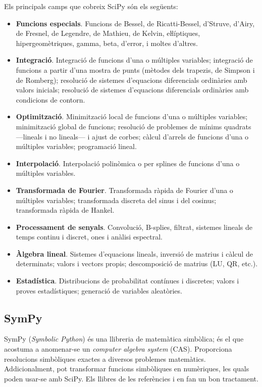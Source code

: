 Els principals camps  que cobreix SciPy són els següents:
\begin{itemize}
	\item \textbf{Funcions especials}. Funcions de Bessel, de Ricatti-Bessel, d'Struve,  d'Airy, de Fresnel, de Legendre, de Mathieu, de Kelvin, eŀlíptiques, hipergeomètriques, gamma, beta, d'error,  i moltes d'altres.
	\item \textbf{Integració}. Integració de funcions d'una o múltiples variables; integració de funcions a partir d'una mostra de punts (mètodes dels trapezis, de Simpson i de Romberg); resolució de sistemes d'equacions diferencials ordinàries amb valors inicials; resolució de sistemes d'equacions diferencials ordinàries amb condicions de contorn.
	\item \textbf{Optimització}. Minimització local de funcions d'una o múltiples variables; minimització global de funcions; resolució de problemes de mínims quadrats ---lineals i no lineals--- i ajust de corbes; càlcul d'arrels de funcions d'una o múltiples variables;  programació lineal.
	\item \textbf{Interpolació}. Interpolació polinòmica o per splines de funcions d'una o múltiples variables.
	\item \textbf{Transformada de Fourier}. Transformada ràpida de Fourier d'una o múltiples variables; transformada discreta del sinus i del cosinus; transformada ràpida de Hankel.
	\item \textbf{Processament de senyals}. Convolució, B-splies, filtrat, sistemes lineals de temps continu i discret, ones i anàlisi espectral.
	\item \textbf{Àlgebra lineal}. Sistemes d'equacions lineals, inversió de matrius i càlcul de determinats; valors i vectors propis; descomposició de matrius (LU, QR, etc.).
	\item \textbf{Estadística}. Distribucions de probabilitat contínues i discretes; valors i proves estadístiques; generació de variables aleatòries.
\end{itemize}


\subsection{SymPy}

SymPy (\textit{Symbolic Python}) és una llibreria de matemàtica simbòlica; és el que acostuma a anomenar-se un \textit{computer algebra system} (CAS). Proporciona resolucions simbòliques exactes a diversos problemes matemàtics. Addicionalment, pot transformar funcions simbòliques en numèriques, les quals poden usar-se amb SciPy. Els llibres de les referències \cite{JOH} i \cite{HIL} en fan un bon tractament.

